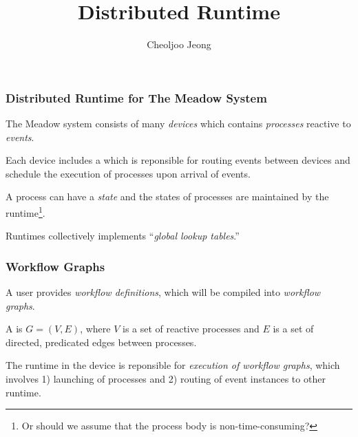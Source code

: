 \documentclass{beamer}
\title{Distributed Runtime}
\author{Cheoljoo Jeong}
\date{}
\begin{document}
\begin{frame}
\titlepage
\end{frame}


\begin{frame}
\frametitle{Distributed Runtime for The Meadow System}

The Meadow system consists of many {\em devices\/} which contains {\em
  processes\/} reactive to {\em events\/}. 

\vspace*{0.3cm}

Each device includes a  which is reponsible for routing
events between devices and schedule the execution of processes upon
arrival of events.

\vspace*{0.3cm}

A process can have a {\em state\/} and the states of processes are maintained
by the runtime\footnote{Or should we assume that the process body is
  non-time-consuming?}.

\vspace*{0.3cm}

Runtimes collectively implements ``{\em{}global lookup tables\/}.''

\end{frame}


\begin{frame}[fragile]
\frametitle{Workflow Graphs}

A user provides {\em workflow definitions}, which will be compiled into
{\em workflow graphs\/}. 

\vspace*{0.4cm}

A  is $G = (V, E)$, where $V$ is a set of 
reactive processes and $E$ is a set of directed, predicated edges between
processes. 

\vspace*{0.4cm}

The runtime in the device is reponsible for {\em execution of workflow
  graphs\/}, which involves 1) launching of processes and 2) routing of event
instances to other runtime.

\end{frame}
\end{document}
